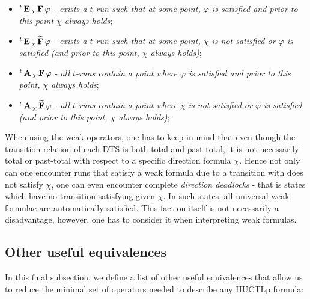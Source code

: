 \begin{itemize}
	\item ${}^{t}\operatorname{\mathbf{E}}{}_{\chi}\operatorname{\mathbf{F}} \varphi$ - \emph{exists a $t$-run such that at some point, $\varphi$ is satisfied and prior to this point $\chi$ always holds};
	\item ${}^{t}\operatorname{\mathbf{E}}{}_{\chi}\operatorname{\mathbf{\widetilde{F}}} \varphi$ - \emph{exists a $t$-run such that at some point, $\chi$ is not satisfied or $\varphi$ is satisfied (and prior to this point, $\chi$ always holds)};
	\item ${}^{t}\operatorname{\mathbf{A}}{}_{\chi}\operatorname{\mathbf{F}} \varphi$ - \emph{all $t$-runs contain a point where $\varphi$ is satisfied and prior to this point, $\chi$ always holds};
	\item ${}^{t}\operatorname{\mathbf{A}}{}_{\chi}\operatorname{\mathbf{\widetilde{F}}} \varphi$ - \emph{all $t$-runs contain a point where $\chi$ is not satisfied or $\varphi$ is satisfied (and prior to this point, $\chi$ always holds)};
\end{itemize}

When using the weak operators, one has to keep in mind that even though the transition relation of each \ac{DTS} is both total and past-total, it is not necessarily total or past-total with respect to a specific direction formula $\chi$. Hence not only can one encounter runs that satisfy a weak formula due to a transition with does not satisfy $\chi$, one can even encounter complete \emph{direction deadlocks} - that is states which have no transition satisfying given $\chi$. In such states, all universal weak formulae are automatically satisfied. This fact on itself is not necessarily a disadvantage, however, one has to consider it when interpreting weak formulas.

\subsection{Other useful equivalences}

In this final subsection, we define a list of other useful equivalences that allow us to reduce the minimal set of operators needed to describe any \ac{HUCTLp} formula:

